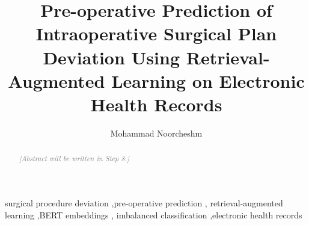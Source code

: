 \documentclass[3p, authoryear]{elsarticle}
\begin{document}
\begin{frontmatter}

\title{Pre-operative Prediction of Intraoperative Surgical Plan Deviation
       Using Retrieval-Augmented Learning on Electronic Health Records}

\author[inst1]{Mohammad Noorcheshm}

\address[inst1]{Department PLACEHOLDER, Faculty PLACEHOLDER,
                University PLACEHOLDER, City, Country}

\begin{abstract}
\textcolor{gray}{\textit{[Abstract will be written in Step 8.]}}
\end{abstract}

\begin{keyword}
surgical procedure deviation \sep pre-operative prediction \sep
retrieval-augmented learning \sep BERT embeddings \sep
imbalanced classification \sep electronic health records
\end{keyword}

\end{frontmatter}

\end{document}
